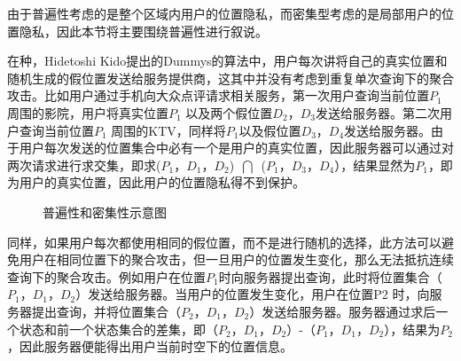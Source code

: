 由于普遍性考虑的是整个区域内用户的位置隐私，而密集型考虑的是局部用户的位置隐私，因此本节将主要围绕普遍性进行叙说。

在\cite{Dummies}种，Hidetoshi Kido提出的Dummys的算法中，用户每次讲将自己的真实位置和随机生成的假位置发送给服务提供商，这其中并没有考虑到重复单次查询下的聚合攻击。比如用户通过手机向大众点评请求相关服务，第一次用户查询当前位置$P_1$周围的影院，用户将真实位置$P_1$ 以及两个假位置$D_2$，$D_3$发送给服务器。第二次用户查询当前位置$P_1$ 周围的KTV，同样将$P_1$以及假位置$D_3$，$D_4$发送给服务器。由于用户每次发送的位置集合中必有一个是用户的真实位置，因此服务器可以通过对两次请求进行求交集，即求($P_1$，$D_1$，$D_2$)~$\bigcap$~($P_1$，$D_3$，$D_4$），结果显然为$P_1$，即为用户的真实位置，因此用户的位置隐私得不到保护。

\begin{figure}
 \centering
 \hspace{1in}
 \caption{普遍性和密集性示意图} \label{fig:subfig} %
\end{figure}
同样，如果用户每次都使用相同的假位置，而不是进行随机的选择，此方法可以避免用户在相同位置下的聚合攻击，但一旦用户的位置发生变化，那么无法抵抗连续查询下的聚合攻击。例如用户在位置$P_1$时向服务器提出查询，此时将位置集合（$P_1$，$D_1$，$D_2$）发送给服务器。当用户的位置发生变化，用户在位置P2 时，向服务器提出查询，并将位置集合（$P_2$，$D_1$，$D_2$）发送给服务器。服务器通过求后一个状态和前一个状态集合的差集，即（$P_2$，$D_1$，$D_2$）-（$P_1$，$D_1$，$D_2$），结果为$P_2$，因此服务器便能得出用户当前时空下的位置信息。

